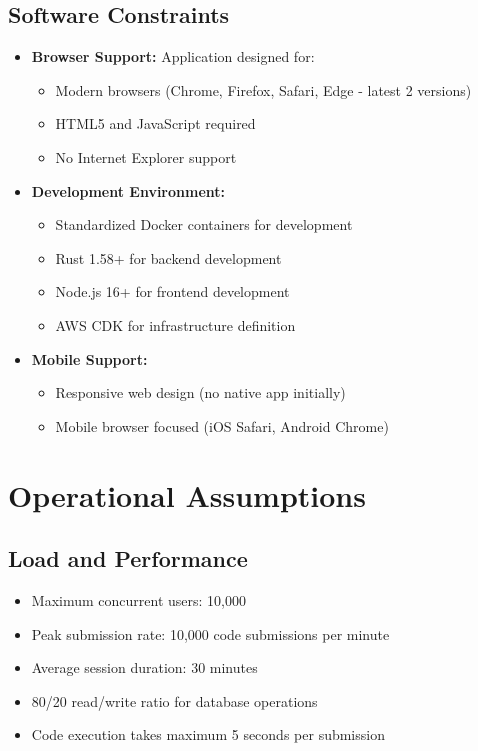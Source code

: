 \documentclass[a4paper, 11pt]{scrreprt}
\begin{document}
\subsection{Software Constraints}
\begin{itemize}
    \item \textbf{Browser Support:} Application designed for:
    \begin{itemize}
        \item Modern browsers (Chrome, Firefox, Safari, Edge - latest 2 versions)
        \item HTML5 and JavaScript required
        \item No Internet Explorer support
    \end{itemize}
    
    \item \textbf{Development Environment:}
    \begin{itemize}
        \item Standardized Docker containers for development
        \item Rust 1.58+ for backend development
        \item Node.js 16+ for frontend development
        \item AWS CDK for infrastructure definition
    \end{itemize}
    
    \item \textbf{Mobile Support:}
    \begin{itemize}
        \item Responsive web design (no native app initially)
        \item Mobile browser focused (iOS Safari, Android Chrome)
    \end{itemize}
\end{itemize}

\section{Operational Assumptions}

\subsection{Load and Performance}
\begin{itemize}
    \item Maximum concurrent users: 10,000
    \item Peak submission rate: 10,000 code submissions per minute
    \item Average session duration: 30 minutes
    \item 80/20 read/write ratio for database operations
    \item Code execution takes maximum 5 seconds per submission
\end{itemize}
\end{document}
